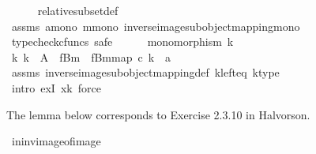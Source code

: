 \begin{isabellebody}
\ \ \ \ \isamarkupfalse%
\ relative{\isacharunderscore}{\kern0pt}subset{\isacharunderscore}{\kern0pt}def{}\ \isanewline
\ \ \ \ \isamarkupfalse%
\ assms\ a{\isacharunderscore}{\kern0pt}mono\ m{\isacharunderscore}{\kern0pt}mono\ inverse{\isacharunderscore}{\kern0pt}image{\isacharunderscore}{\kern0pt}subobject{\isacharunderscore}{\kern0pt}mapping{\isacharunderscore}{\kern0pt}mono\isanewline
\ \ \isamarkupfalse%
\ {\isacharparenleft}{\kern0pt}typecheck{\isacharunderscore}{\kern0pt}cfuncs{\isacharcomma}{\kern0pt}\ safe{\isacharparenright}{\kern0pt}\isanewline
\ \ \ \ \isamarkupfalse%
\ {\isachardoublequoteopen}monomorphism\ k{\isachardoublequoteclose}\isanewline
\ \ \ \ \isamarkupfalse%
\ \isamarkupfalse%
\ {\isachardoublequoteopen}{\isasymexists}k{\isachardot}{\kern0pt}\ k\ {\isacharcolon}{\kern0pt}\ A\ {\isasymrightarrow}\ f\isactrlsup {\isacharminus}{\kern0pt}B{\isasymrparr}\isactrlbsub m\isactrlesub \ {\isasymand}\ {\isacharbrackleft}{\kern0pt}f\isactrlsup {\isacharminus}{\kern0pt}B{\isasymrparr}\isactrlbsub m\isactrlesub {\isacharbrackright}{\kern0pt}map\ {\isasymcirc}\isactrlsub c\ k\ {\isacharequal}{\kern0pt}\ a{\isachardoublequoteclose}\isanewline
\ \ \ \ \ \ \isamarkupfalse%
\ assms{\isacharparenleft}{\kern0pt}{}{\isacharparenright}{\kern0pt}\ inverse{\isacharunderscore}{\kern0pt}image{\isacharunderscore}{\kern0pt}subobject{\isacharunderscore}{\kern0pt}mapping{\isacharunderscore}{\kern0pt}def{}\ k{\isacharunderscore}{\kern0pt}left{\isacharunderscore}{\kern0pt}eq\ k{\isacharunderscore}{\kern0pt}type\ \isanewline
\ \ \ \ \ \ \isamarkupfalse%
\ {\isacharparenleft}{\kern0pt}intro\ exI{\isacharbrackleft}{\kern0pt}\ x{\isacharequal}{\kern0pt}k{\isacharbrackright}{\kern0pt}{\isacharcomma}{\kern0pt}\ force{\isacharparenright}{\kern0pt}\isanewline
\ \ \isamarkupfalse%
\isanewline
{}\isamarkupfalse%
%
\endisatagproof
{\isafoldproof}%
%
\isadelimproof
%
\endisadelimproof
%
\begin{isamarkuptext}%
The lemma below corresponds to Exercise 2.3.10 in Halvorson.%
\end{isamarkuptext}\isamarkuptrue%
\isamarkupfalse%
\ in{\isacharunderscore}{\kern0pt}inv{\isacharunderscore}{\kern0pt}image{\isacharunderscore}{\kern0pt}of{\isacharunderscore}{\kern0pt}image{\isacharcolon}{\kern0pt}\isanewline

\end{isabellebody}
